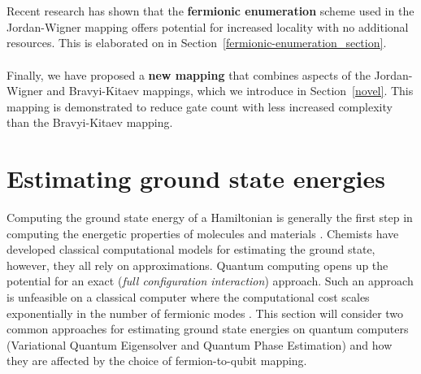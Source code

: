 \documentclass[twoside]{article}
\begin{document}
\\\\
Recent research \cite{fermionicEncoding} has shown that the \textbf{fermionic enumeration} scheme used in the Jordan-Wigner mapping offers potential for increased locality with no additional resources. This is elaborated on in Section~\ref{fermionic-enumeration_section}.
\\\\
Finally, we have proposed a \textbf{new mapping} that combines aspects of the Jordan-Wigner and Bravyi-Kitaev mappings, which we introduce in Section~\ref{novel}. This mapping is demonstrated to reduce gate count with less increased complexity than the Bravyi-Kitaev mapping.
\section{Estimating ground state energies}\label{applications_section}
Computing the ground state energy of a Hamiltonian is generally the first step in computing the energetic properties of molecules and materials \cite{vqe}. Chemists have developed classical computational models for estimating the ground state, however, they all rely on approximations. Quantum computing opens up the potential for an exact (\textit{full configuration interaction}) approach. Such an approach is unfeasible on a classical computer where the computational cost scales exponentially in the number of fermionic modes \cite{compcost}. This section will consider two common approaches for estimating ground state energies on quantum computers (Variational Quantum Eigensolver and Quantum Phase Estimation) and how they are affected by the choice of fermion-to-qubit mapping.
\end{document}
